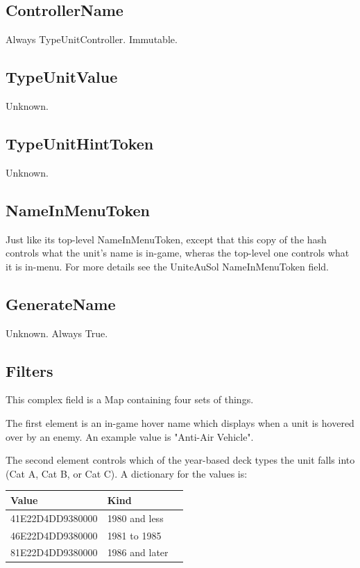 \documentclass{article}
\begin{document}
\subsection{ControllerName}

Always TypeUnitController. Immutable.

\subsection{TypeUnitValue}

Unknown.

\subsection{TypeUnitHintToken}

Unknown.

\subsection{NameInMenuToken}

Just like its top-level NameInMenuToken, except that this copy of the hash controls what the unit's name is in-game, wheras the top-level one controls what it is in-menu. For more details see the UniteAuSol NameInMenuToken field.

\subsection{GenerateName}

Unknown. Always True.

\subsection{Filters}

This complex field is a Map containing four sets of things.

The first element is an in-game hover name which displays when a unit is hovered over by an enemy. An example value is "Anti-Air Vehicle".

The second element controls which of the year-based deck types the unit falls into (Cat A, Cat B, or Cat C). A dictionary for the values is:

\begin{center}
    \begin{tabular}{ | l | l | l |}
    \hline
	Value & Kind\\ \hline
41E22D4DD9380000 & 1980 and less\\
46E22D4DD9380000 & 1981 to 1985\\
81E22D4DD9380000 & 1986 and later\\
    \hline
    \end{tabular}
\end{center}
\end{document}
